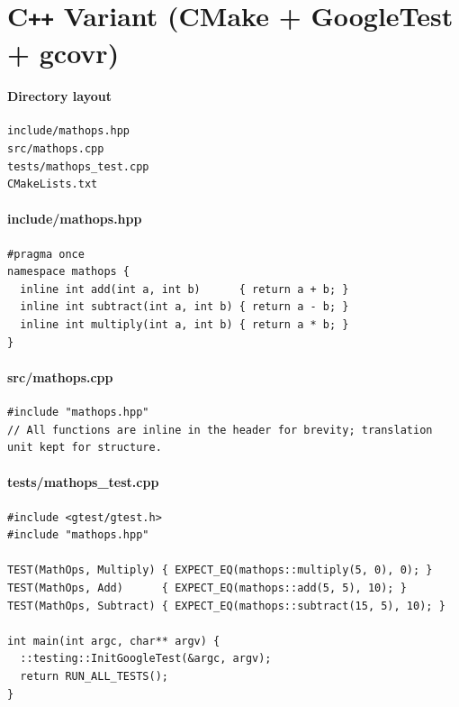 \documentclass[11pt]{article}
\begin{document}
\section{C\texttt{++} Variant (CMake + GoogleTest + gcovr)}
\paragraph{Directory layout}
\begin{verbatim}
include/mathops.hpp
src/mathops.cpp
tests/mathops_test.cpp
CMakeLists.txt
\end{verbatim}

\paragraph{include/mathops.hpp}
\begin{verbatim}
#pragma once
namespace mathops {
  inline int add(int a, int b)      { return a + b; }
  inline int subtract(int a, int b) { return a - b; }
  inline int multiply(int a, int b) { return a * b; }
}
\end{verbatim}

\paragraph{src/mathops.cpp}
\begin{verbatim}
#include "mathops.hpp"
// All functions are inline in the header for brevity; translation unit kept for structure.
\end{verbatim}

\paragraph{tests/mathops\_test.cpp}
\begin{verbatim}
#include <gtest/gtest.h>
#include "mathops.hpp"

TEST(MathOps, Multiply) { EXPECT_EQ(mathops::multiply(5, 0), 0); }
TEST(MathOps, Add)      { EXPECT_EQ(mathops::add(5, 5), 10); }
TEST(MathOps, Subtract) { EXPECT_EQ(mathops::subtract(15, 5), 10); }

int main(int argc, char** argv) {
  ::testing::InitGoogleTest(&argc, argv);
  return RUN_ALL_TESTS();
}
\end{verbatim}
\clearpage
\end{document}
